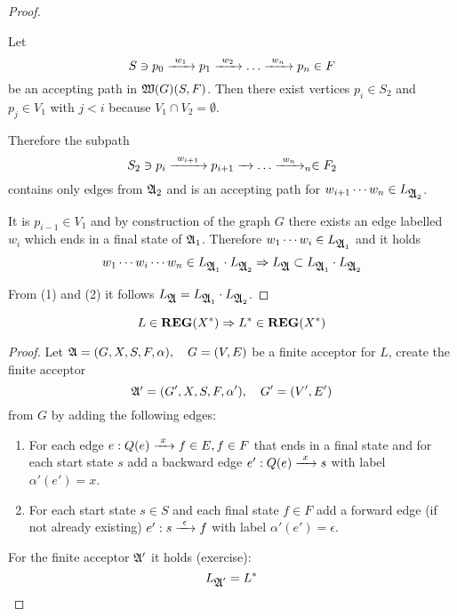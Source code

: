 \begin{proof}
\begin{enumerate}
  Let \[ S \ni p_0 \xrightarrow{\ {w_1}\ } p_1 \xrightarrow{\ {w_2}\ } \ldots \xrightarrow{\ {w_n}\ } p_n \in F \]
  be an accepting path in $\mbox{$\mathfrak{W}({G})$}(S, F)$. Then there exist vertices $p_i
  \in S_2$ and $p_j \in V_1$ with $j < i$ because $V_1 \cap V_2 = \emptyset$.
  
  \missingfigure
  
  Therefore the subpath 
  \[ S_2 \ni p_i \xrightarrow{\ {w_{i+1}}\ } p_{i+1} \xrightarrow{\ {}\ } \ldots \xrightarrow{\ {w_n}\ } _n \in F_2 \]
  contains only edges from $\mbox{$\mathfrak{A}$}_2$ and is an accepting path for 
  $w_{i+1} \cdots w_n \in L_{\mbox{$\mathfrak{A}$}_2}$.
  
  It is $p_{i-1} \in V_1$ and by construction of the graph $G$ there exists
  an edge labelled $w_i$ which ends in a final state of $\mbox{$\mathfrak{A}$}_1$. Therefore
  $w_1 \cdots w_i \in L_{\mbox{$\mathfrak{A}$}_1}$ and it holds 
  \[ w_1 \cdots w_i \cdots w_n \in L_{\mbox{$\mathfrak{A}$}_1} \cdot L_{\mbox{$\mathfrak{A}$}_2} \Rightarrow
  L_{\mbox{$\mathfrak{A}$}} \subset L_{\mbox{$\mathfrak{A}$}_1} \cdot L_{\mbox{$\mathfrak{A}$}_2} \]
\end{enumerate}

From (1) and (2) it follows $L_{\mbox{$\mathfrak{A}$}} = L_{\mbox{$\mathfrak{A}$}_1} \cdot L_{\mbox{$\mathfrak{A}$}_2}$.
\end{proof}

\bigskip
\begin{theorem}
\[ L \in \mbox{{\bf REG}}(X^*) \Rightarrow L^* \in \mbox{{\bf REG}}(X^*) \]
\end{theorem}

\begin{proof}
Let $\mbox{$\mathfrak{A}$} = (G, X, S, F, \alpha),\quad G=(V,E)$	be a finite acceptor for $L$,
create the finite acceptor
\[ \mbox{$\mathfrak{A'}$} = (G', X, S, F, \alpha'),\quad G'=(V',E') \]
from $G$ by adding the following edges: 

\begin{enumerate}
  \item For each edge $e : Q(e) \xrightarrow{\ {x}\ } f \in E,f \in F$ that ends in a final 
  state and for each start state $s$ add a backward edge $e' : Q(e) \xrightarrow{\ {x}\ } s$ 
  with label $\alpha'(e') = x$.
  \item For each start state $s \in S$ and each final state $f \in F$ add a
  forward edge (if not already existing) $e' : s \xrightarrow{\ {\epsilon}\ } f$ with
  label $\alpha'(e') = \epsilon$.
\end{enumerate}

\begin{center}

\end{center}

For the finite acceptor $\mbox{$\mathfrak{A'}$}$ it holds (exercise): \[ L_{\mbox{$\mathfrak{A}$}'} = L^* \]
\end{proof}

